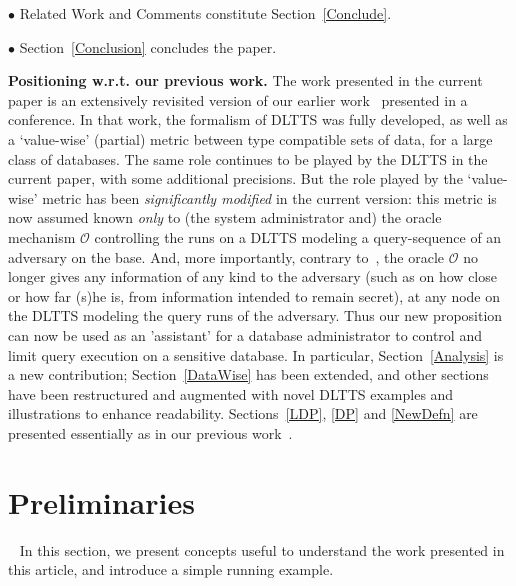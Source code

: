 \documentclass[pdflatex]{article}
\def \o {{\mathcal{O}}}
\begin{document}
{  $\bullet$  Related Work and Comments constitute Section~\ref{Conclude}. 

  
  $\bullet$  Section~\ref{Conclusion} concludes the paper.  
     }   %

   \textbf{Positioning w.r.t. our previous work.} The work presented
  in the current  paper is an extensively revisited version   of our
  earlier  work~\cite{siva-etal-2022} presented in a conference.
  In that work, the formalism of DLTTS was fully developed, as well as a 
  `value-wise' (partial) metric between  type compatible sets of data,  for  a large
  class of databases. The same role continues to be played by the DLTTS in the
  current paper, with some additional precisions. But the role played by the `value-wise'
  metric  has been {\em significantly modi\-fied} in the current version:  this 
  metric   is  now assumed known  {\em only} to (the system administrator and)   the
  oracle  mechanism $\o$ controlling the runs   on a DLTTS  modeling a query-sequence
  of an adversary on  the base. And, more importantly, contrary to~\cite{siva-etal-2022},
  the oracle $\o$ no longer   gives any  information of any  kind  to the  adversary
  (such as  on how close or how   far (s)he is, from  information  intended to
  remain  secret),  at any node on the   DLTTS modeling  the query  runs of the
  adversary. Thus our new proposition can now be used as an 'assistant' for a
  database administrator to control and limit query execution on a sensitive database.
  In particular, Section~\ref{Analysis} is a new contribution; Section~\ref{DataWise}
  has been extended, and other sections have been restructured and augmented with
  novel DLTTS examples and illustrations to enhance readability.
  Sections~\ref{LDP}, \ref{DP} and \ref{NewDefn} are presented essentially
  as in our previous work~\cite{siva-etal-2022}.

 
\section{ {\large Preliminaries}}~\label{prelim}  
In this section, we present concepts useful to understand the work presented in
this article, and introduce a simple running example.
\end{document}
